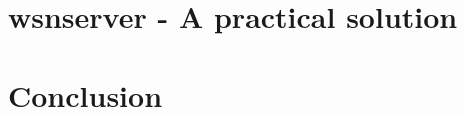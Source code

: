 \documentclass[bibtotocnumbered, headsepline,normalheadings]{report}
\begin{document}
\chapter{wsnserver - A practical solution}



\chapter{Conclusion}






\end{document}
